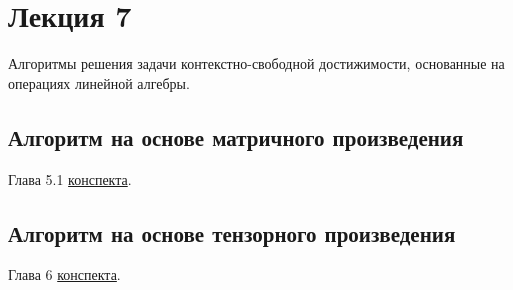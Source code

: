 \section{Лекция 7}

Алгоритмы решения задачи контекстно-свободной достижимости, основанные на операциях линейной алгебры.

\subsection{Алгоритм на основе матричного произведения}

Глава 5.1 \href{https://github.com/YaccConstructor/articles/blob/master/InProgress/Formal_langs_CFPQ_course_notes/Formal_lang_CFPQ_course_notes.pdf}{конспекта}.

\subsection{Алгоритм на основе тензорного произведения}

Глава 6 \href{https://github.com/YaccConstructor/articles/blob/master/InProgress/Formal_langs_CFPQ_course_notes/Formal_lang_CFPQ_course_notes.pdf}{конспекта}.
